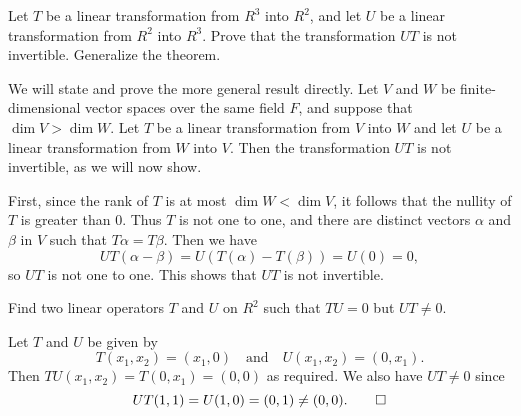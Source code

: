  Let $T$ be a linear transformation from $R^3$ into $R^2$,
and let $U$ be a linear transformation from $R^2$ into $R^3$. Prove
that the transformation $UT$ is not invertible. Generalize the
theorem.
\begin{solution}
  We will state and prove the more general result directly. Let $V$
  and $W$ be finite-dimensional vector spaces over the same field $F$,
  and suppose that $\dim V > \dim W$. Let $T$ be a linear
  transformation from $V$ into $W$ and let $U$ be a linear
  transformation from $W$ into $V$. Then the transformation $UT$ is
  not invertible, as we will now show.

  First, since the rank of $T$ is at most $\dim W < \dim V$, it
  follows that the nullity of $T$ is greater than $0$. Thus $T$ is not
  one to one, and there are distinct vectors $\alpha$ and $\beta$ in
  $V$ such that $T\alpha = T\beta$. Then we have
  \begin{equation*}
    UT(\alpha - \beta) = U(T(\alpha) - T(\beta)) = U(0) = 0,
  \end{equation*}
  so $UT$ is not one to one. This shows that $UT$ is not invertible.
\end{solution}

 Find two linear operators $T$ and $U$ on $R^2$ such that
$TU = 0$ but $UT \neq 0$.
\begin{solution}
  Let $T$ and $U$ be given by
  \begin{equation*}
    T(x_1,x_2) = (x_1,0) \quad\text{and}\quad
    U(x_1,x_2) = (0,x_1).
  \end{equation*}
  Then $TU(x_1,x_2) = T(0,x_1) = (0, 0)$ as required. We also have
  $UT\neq0$ since
  \begin{equation*}
    UT(1,1) = U(1,0) = (0,1) \neq (0,0). \qedhere
  \end{equation*}
\end{solution}
